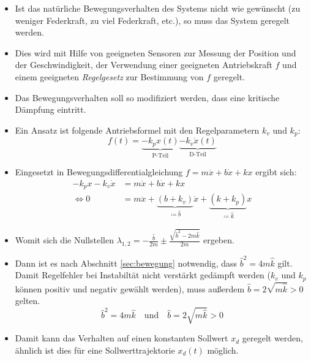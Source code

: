 				\begin{itemize}
					\item Ist das natürliche Bewegungsverhalten des Systems nicht wie gewünscht (zu weniger Federkraft, zu viel Federkraft, etc.), so muss das System geregelt werden.
					\item Dies wird mit Hilfe von geeigneten Sensoren zur Messung der Position und der Geschwindigkeit, der Verwendung einer geeigneten Antriebskraft \(f\) und einem geeigneten \textit{Regelgesetz} zur Bestimmung von \(f\) geregelt.
					\item Das Bewegungsverhalten soll so modifiziert werden, dass eine kritische Dämpfung eintritt.
					\item Ein Ansatz ist folgende Antriebsformel mit den Regelparametern \( k _ v \) und \( k _ p \):
						\begin{equation*}
							f(t) = \underbrace{-k_px(t)}_{\text{P-Teil}} \underbrace{-k_v\dot{x}(t)}_{\text{D-Teil}}
						\end{equation*}
					\item Eingesetzt in Bewegungsdifferentialgleichung \( f = m\ddot{x} + b\dot{x} + kx \) ergibt sich:
						\begin{align*}
							-k_px -k_v\dot{x} & = m\ddot{x} + b\dot{x} + kx                                                                                       \\
							\iff 0            & = m\ddot{x} + \underbrace{(b + k_v)}_{ \coloneqq \hat{b} }\dot{x} + \underbrace{(k + k_p)}_{ \coloneqq \hat{k} }x
						\end{align*}
					\item Womit sich die Nullstellen \( \lambda _ { 1, 2 } = -\frac{\hat{b}}{2m} \pm \frac{\sqrt{\hat{b}^2 - 2m\hat{k}}}{2m} \) ergeben.
					\item Dann ist es nach Abschnitt \ref{sec:bewegung} notwendig, dass \( \hat{b}^2 = 4m\hat{k} \) gilt. Damit Regelfehler bei Instabiltät nicht verstärkt gedämpft werden (\( k_v \) und \( k_p \) können positiv und negativ gewählt werden), muss außerdem \( \hat{b} = 2\sqrt{m\hat{k}} > 0 \) gelten.
						\begin{equation*}
							\hat{b}^2 = 4m\hat{k} \quad\text{und}\quad \hat{b} = 2\sqrt{m\hat{k}} > 0
						\end{equation*}
					\item Damit kann das Verhalten auf einen konstanten Sollwert \( x _ d \) geregelt werden, ähnlich ist dies für eine Sollwerttrajektorie \( x _ d (t) \) möglich.
				\end{itemize}

